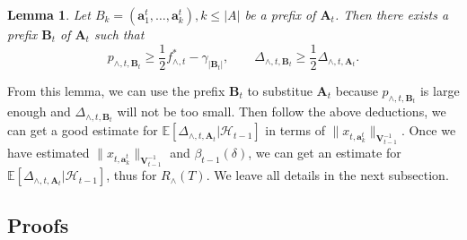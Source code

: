 \documentclass{article}
\newcommand{\EE}{\mathbb{E}}
\newcommand{\bA}{\mathbf{A}}
\newcommand{\ba}{\mathbf{a}}
\newcommand{\bB}{\mathbf{B}}
\newcommand{\bV}{\mathbf{V}}
\newcommand{\cH}{\mathcal{H}}
\newcommand{\abs}[1]{\left| #1 \right|}
\newcommand{\norm}[1]{\| #1 \|}
\newtheorem{lemma}[theorem]{Lemma}%
\begin{document}
\begin{lemma}
\label{lem:prefixExist}
Let $B_k = (\ba_1^t, \ldots, \ba_k^t), k \leq \abs{A}$ be a prefix of $\bA_t$. Then there exists a prefix $\bB_t$ of $\bA_t$ such that
$$
p_{\wedge, t, \bB_t} \geq \frac{1}{2} f_{\wedge, t}^* - \gamma_{\abs{\bB_t}}, \qquad \Delta_{\wedge, t, \bB_t} \geq \frac{1}{2} \Delta_{\wedge, t, \bA_t}.
$$
\end{lemma}
From this lemma, we can use the prefix $\bB_t$ to substitue $\bA_t$ because $p_{\wedge, t, \bB_t}$ is large enough and $\Delta_{\wedge, t, \bB_t}$ will not be too small. Then follow the above deductions, we can get a good estimate for $\EE[\Delta_{\wedge, t, \bA_t}|\cH_{t-1}]$ in terms of $\norm{x_{t,\ba_k^t}}_{\bV_{t-1}^{-1}}$. Once we have estimated $\norm{x_{t,\ba_k^t}}_{\bV_{t-1}^{-1}}$ and $\beta_{t-1}(\delta)$, we can get an estimate for $\EE[\Delta_{\wedge, t, \bA_t}|\cH_{t-1}]$, thus for $R_{\wedge}(T)$. We leave all details in the next subsection.


\subsection{Proofs}
\end{document}
